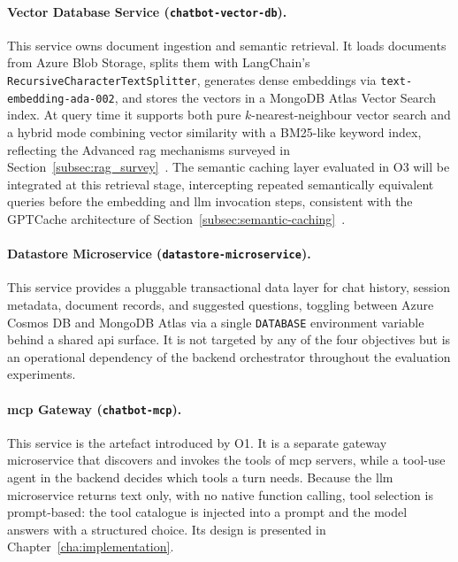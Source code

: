 \paragraph{Vector Database Service (\texttt{chatbot-vector-db}).}
This service owns document ingestion and semantic retrieval.
It loads documents from Azure Blob Storage, splits them with LangChain's
\texttt{RecursiveCharacterTextSplitter}, generates dense embeddings via
\texttt{text-embedding-ada-002}, and stores the vectors in a MongoDB Atlas
Vector Search index.
At query time it supports both pure $k$-nearest-neighbour vector search and a
hybrid mode combining vector similarity with a BM25-like keyword index,
reflecting the Advanced \gls{rag} mechanisms surveyed in
Section~\ref{subsec:rag_survey}~\cite{gao2023ragsurvey}.
The semantic caching layer evaluated in O3 will be integrated at this retrieval
stage, intercepting repeated semantically equivalent queries before the
embedding and \gls{llm} invocation steps, consistent with the GPTCache architecture
of Section~\ref{subsec:semantic-caching}~\cite{bang2023gptcache}.

\paragraph{Datastore Microservice (\texttt{datastore-microservice}).}
This service provides a pluggable transactional data layer for chat history,
session metadata, document records, and suggested questions, toggling between
Azure Cosmos DB and MongoDB Atlas via a single \texttt{DATABASE} environment
variable behind a shared \gls{api} surface.
It is not targeted by any of the four objectives but is an operational
dependency of the backend orchestrator throughout the evaluation experiments.

\paragraph{\gls{mcp} Gateway (\texttt{chatbot-mcp}).}
This service is the artefact introduced by O1.
It is a separate gateway microservice that discovers and invokes the tools of
\gls{mcp} servers, while a tool-use agent in the backend decides which tools a
turn needs.
Because the \gls{llm} microservice returns text only, with no native function
calling, tool selection is prompt-based: the tool catalogue is injected into a
prompt and the model answers with a structured choice.
Its design is presented in Chapter~\ref{cha:implementation}.

